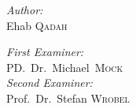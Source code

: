 \begin{titlepage}
\begin{center}
			\begin{minipage}[t]{0.4\textwidth}
				\begin{flushleft} \large
					\emph{Author:}\\
					Ehab \textsc{Qadah}
				\end{flushleft}
			\end{minipage}
			\begin{minipage}[t]{0.5\textwidth}
				\begin{flushright} \large
					\emph{First Examiner:} \\
					PD.~Dr.~Michael~\textsc{Mock} \\[0.5cm]
					\emph{Second Examiner:} \\
					Prof.~Dr.~Stefan \textsc{Wrobel} \\[0.5cm]
					
				\end{flushright}
			\end{minipage}
			
			\vfill
			
			{\large  \hspace{1cm} \date{\dmyyyydate \today} }
			
		\end{center}
	\end{titlepage}
